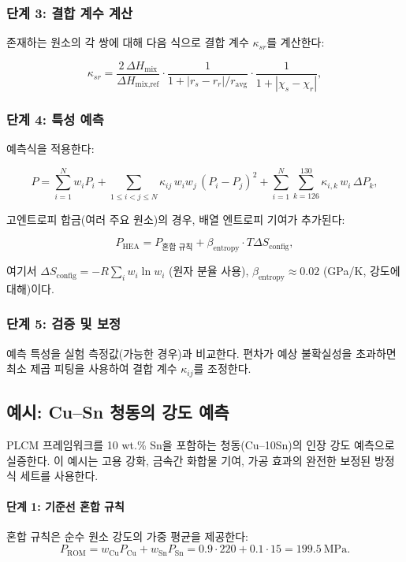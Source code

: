 \documentclass[12pt,a4paper]{article}
\begin{document}
	\subsubsection{단계 3: 결합 계수 계산}
	
	존재하는 원소의 각 쌍에 대해 다음 식으로 결합 계수 \(\kappa_{sr}\)를 계산한다:
	
	\[
	\kappa_{sr} = \frac{2\,\Delta H_{\text{mix}}}{\Delta H_{\text{mix,ref}}} \cdot
	\frac{1}{1 + |r_s - r_r|/r_{\text{avg}}} \cdot
	\frac{1}{1 + |\chi_s - \chi_r|},
	\]
	
	\subsubsection{단계 4: 특성 예측}
	
	예측식을 적용한다:
	
	\[
	P = \sum_{i=1}^{N} w_i P_i
	+ \sum_{1\le i<j\le N} \kappa_{ij}\, w_i w_j\, (P_i - P_j)^2
	+ \sum_{i=1}^{N} \sum_{k=126}^{130} \kappa_{i,k}\, w_i\, \Delta P_k,
	\]
	
	고엔트로피 합금(여러 주요 원소)의 경우, 배열 엔트로피 기여가 추가된다:
	
	\[
	P_{\text{HEA}} = P_{\text{혼합 규칙}} + \beta_{\text{entropy}} \cdot T \Delta S_{\text{config}},
	\]
	
	여기서 \(\Delta S_{\text{config}} = -R \sum_i w_i \ln w_i\) (원자 분율 사용), \(\beta_{\text{entropy}} \approx 0.02\) (GPa/K, 강도에 대해)이다.
	
	\subsubsection{단계 5: 검증 및 보정}
	
	예측 특성을 실험 측정값(가능한 경우)과 비교한다. 편차가 예상 불확실성을 초과하면 최소 제곱 피팅을 사용하여 결합 계수 \(\kappa_{ij}\)를 조정한다.
	
	\subsection{예시: Cu–Sn 청동의 강도 예측}
	\label{subsec:example-bronze}
	
	PLCM 프레임워크를 10 wt.\% Sn을 포함하는 청동(Cu–10Sn)의 인장 강도 예측으로 실증한다. 이 예시는 고용 강화, 금속간 화합물 기여, 가공 효과의 완전한 보정된 방정식 세트를 사용한다.
	
	\paragraph{단계 1: 기준선 혼합 규칙}
	혼합 규칙은 순수 원소 강도의 가중 평균을 제공한다:
	\[
	P_{\text{ROM}} = w_{\text{Cu}} P_{\text{Cu}} + w_{\text{Sn}} P_{\text{Sn}} = 0.9 \cdot 220 + 0.1 \cdot 15 = 199.5\ \text{MPa}.
	\]
	
\end{document}
